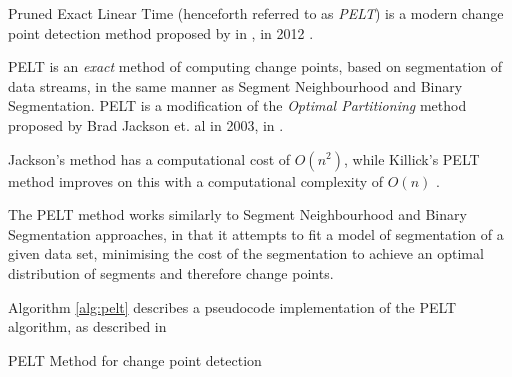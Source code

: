 \documentclass{uvamscse}	%
\begin{document}
Pruned Exact Linear Time (henceforth referred to as \emph{PELT}) is a modern change point detection method proposed by \citeauthor{Killick2011a} in , in 2012 \cite{Killick2011a}.

PELT is an \emph{exact} method of computing change points, based on segmentation of data streams, in the same manner as Segment Neighbourhood and Binary Segmentation. PELT is a modification of the \emph{Optimal Partitioning} method proposed by Brad Jackson et. al in 2003, in \cite{Jackson2003}.

Jackson's method has a computational cost of $O(n^2)$, while Killick's PELT method improves on this with a computational complexity of $O(n)$ \cite{Killick2011a}.

The PELT method works similarly to Segment Neighbourhood \cite{Auger1989} and Binary Segmentation \cite{Jackson2003} \cite{Yao1984} approaches, in that it attempts to fit a model of segmentation of a given data set, minimising the cost of the segmentation to achieve an optimal distribution of segments and therefore change points.

Algorithm \autoref{alg:pelt} describes a pseudocode implementation of the PELT algorithm, as described in \cite{Eckley2011}\newline

\begin{algorithm}[H]
    \label{alg:pelt}
    \caption{PELT Method for change point detection}
    \DontPrintSemicolon
\end{algorithm}
\end{document}

